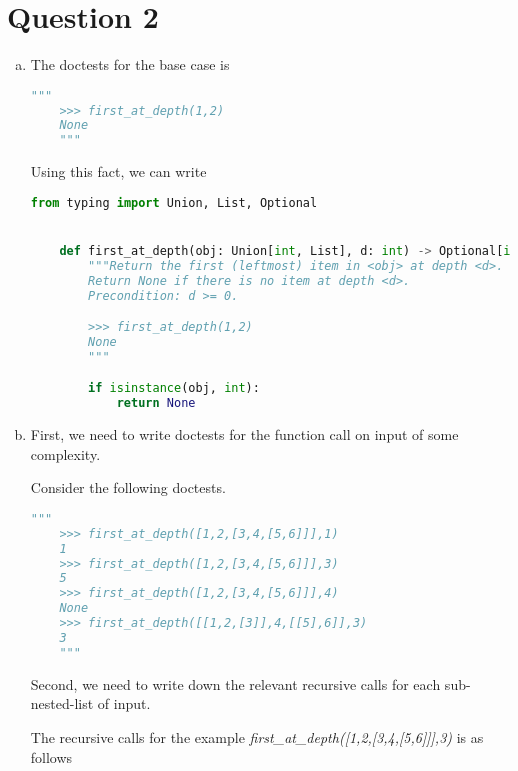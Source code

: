 \documentclass[12pt]{article}
\begin{document}
\section*{Question 2}
\begin{enumerate}[a.]
    \item The doctests for the base case is

    \begin{lstlisting}[language=python]
    """
    >>> first_at_depth(1,2)
    None
    """
    \end{lstlisting}

    \bigskip

    Using this fact, we can write

    \begin{lstlisting}[language=python,caption={worksheet\_16\_q2a\_solution}]
    from typing import Union, List, Optional


    def first_at_depth(obj: Union[int, List], d: int) -> Optional[int]:
        """Return the first (leftmost) item in <obj> at depth <d>.
        Return None if there is no item at depth <d>.
        Precondition: d >= 0.

        >>> first_at_depth(1,2)
        None
        """

        if isinstance(obj, int):
            return None
    \end{lstlisting}
    \item

    \bigskip

    First, we need to write doctests for the function call on input of some complexity.

    \bigskip

    Consider the following doctests.

    \begin{lstlisting}[language=python]
    """
    >>> first_at_depth([1,2,[3,4,[5,6]]],1)
    1
    >>> first_at_depth([1,2,[3,4,[5,6]]],3)
    5
    >>> first_at_depth([1,2,[3,4,[5,6]]],4)
    None
    >>> first_at_depth([[1,2,[3]],4,[[5],6]],3)
    3
    """
    \end{lstlisting}

    \bigskip

    Second, we need to write down the relevant recursive calls for each sub-nested-list of input.

    \bigskip

    The recursive calls for the example \textit{first\_at\_depth([1,2,[3,4,[5,6]]],3)}
    is as follows


\end{enumerate}
\end{document}
